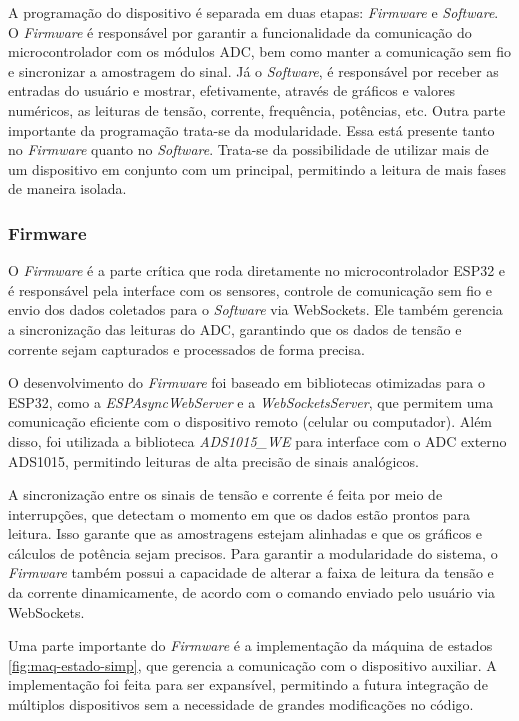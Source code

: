 A programação do dispositivo é separada em duas etapas: \textit{Firmware} e \textit{Software}. O \textit{Firmware} é responsável por garantir a funcionalidade da comunicação do microcontrolador com os módulos \gls{ADC}, bem como manter a comunicação sem fio e sincronizar a amostragem do sinal.
Já o \textit{Software}, é responsável por receber as entradas do usuário e mostrar, efetivamente, através de gráficos e valores numéricos, as leituras de tensão, corrente, frequência, potências, etc.
Outra parte importante da programação trata-se da modularidade. Essa está presente tanto no \textit{Firmware} quanto no \textit{Software}. Trata-se da possibilidade de utilizar mais de um dispositivo em conjunto com um principal, permitindo a leitura de mais fases de maneira isolada.

\subsubsection{Firmware}\label{firmw}

O \textit{Firmware} é a parte crítica que roda diretamente no microcontrolador ESP32 e é responsável pela interface com os sensores, controle de comunicação sem fio e envio dos dados coletados para o \textit{Software} via WebSockets. Ele também gerencia a sincronização das leituras do ADC, garantindo que os dados de tensão e corrente sejam capturados e processados de forma precisa.

O desenvolvimento do \textit{Firmware} foi baseado em bibliotecas otimizadas para o ESP32, como a \textit{ESPAsyncWebServer} e a \textit{WebSocketsServer}, que permitem uma comunicação eficiente com o dispositivo remoto (celular ou computador). Além disso, foi utilizada a biblioteca \textit{ADS1015\_WE} para interface com o ADC externo ADS1015, permitindo leituras de alta precisão de sinais analógicos.

A sincronização entre os sinais de tensão e corrente é feita por meio de interrupções, que detectam o momento em que os dados estão prontos para leitura. Isso garante que as amostragens estejam alinhadas e que os gráficos e cálculos de potência sejam precisos. Para garantir a modularidade do sistema, o \textit{Firmware} também possui a capacidade de alterar a faixa de leitura da tensão e da corrente dinamicamente, de acordo com o comando enviado pelo usuário via WebSockets.

Uma parte importante do \textit{Firmware} é a implementação da máquina de estados \autoref{fig:maq-estado-simp}, que gerencia a comunicação com o dispositivo auxiliar. A implementação foi feita para ser expansível, permitindo a futura integração de múltiplos dispositivos sem a necessidade de grandes modificações no código.

